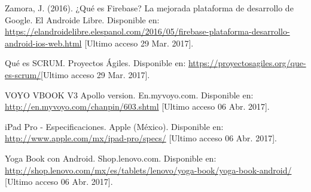 \documentclass[oneside,12pt]{book}
\begin{document}
\begin{thebibliography}{50}
Zamora, J. (2016). ¿Qué es Firebase? La mejorada plataforma de desarrollo de Google. El Androide Libre. Disponible en: \url{https://elandroidelibre.elespanol.com/2016/05/firebase-plataforma-desarrollo-android-ios-web.html} [Ultimo acceso 29 Mar. 2017].

Qué es SCRUM. Proyectos Ágiles. Disponible en: \url{https://proyectosagiles.org/que-es-scrum/}[Ultimo acceso 29 Mar. 2017].

VOYO VBOOK V3 Apollo version. En.myvoyo.com. Disponible en: \url{http://en.myvoyo.com/chanpin/603.shtml} [Ultimo acceso 06 Abr. 2017].

iPad Pro - Especificaciones. Apple (México). Disponible en: \url{http://www.apple.com/mx/ipad-pro/specs/} [Ultimo acceso 06 Abr. 2017].

Yoga Book con Android. Shop.lenovo.com. Disponible en: \url{http://shop.lenovo.com/mx/es/tablets/lenovo/yoga-book/yoga-book-android/} [Ultimo acceso 06 Abr. 2017].


\end{thebibliography}
\end{document}
